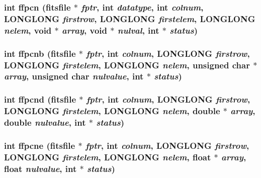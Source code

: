 \subsubsection{\setlength{\rightskip}{0pt plus 5cm}int ffpcn (\bf{fitsfile} $\ast$ {\em fptr}, int {\em datatype}, int {\em colnum}, \bf{LONGLONG} {\em firstrow}, \bf{LONGLONG} {\em firstelem}, \bf{LONGLONG} {\em nelem}, void $\ast$ {\em array}, void $\ast$ {\em nulval}, int $\ast$ {\em status})}\label{fitsio__64_8h_a062602b8a804f46be72152477dc2321}


\subsubsection{\setlength{\rightskip}{0pt plus 5cm}int ffpcnb (\bf{fitsfile} $\ast$ {\em fptr}, int {\em colnum}, \bf{LONGLONG} {\em firstrow}, \bf{LONGLONG} {\em firstelem}, \bf{LONGLONG} {\em nelem}, unsigned char $\ast$ {\em array}, unsigned char {\em nulvalue}, int $\ast$ {\em status})}\label{fitsio__64_8h_52e1f7ec25307939c85af2e5ab92fe5f}


\subsubsection{\setlength{\rightskip}{0pt plus 5cm}int ffpcnd (\bf{fitsfile} $\ast$ {\em fptr}, int {\em colnum}, \bf{LONGLONG} {\em firstrow}, \bf{LONGLONG} {\em firstelem}, \bf{LONGLONG} {\em nelem}, double $\ast$ {\em array}, double {\em nulvalue}, int $\ast$ {\em status})}\label{fitsio__64_8h_521f9cb2a81ba66277d032513255e1f6}


\subsubsection{\setlength{\rightskip}{0pt plus 5cm}int ffpcne (\bf{fitsfile} $\ast$ {\em fptr}, int {\em colnum}, \bf{LONGLONG} {\em firstrow}, \bf{LONGLONG} {\em firstelem}, \bf{LONGLONG} {\em nelem}, float $\ast$ {\em array}, float {\em nulvalue}, int $\ast$ {\em status})}\label{fitsio__64_8h_e90f56227753bb7883ba1b42e31a5f00}


